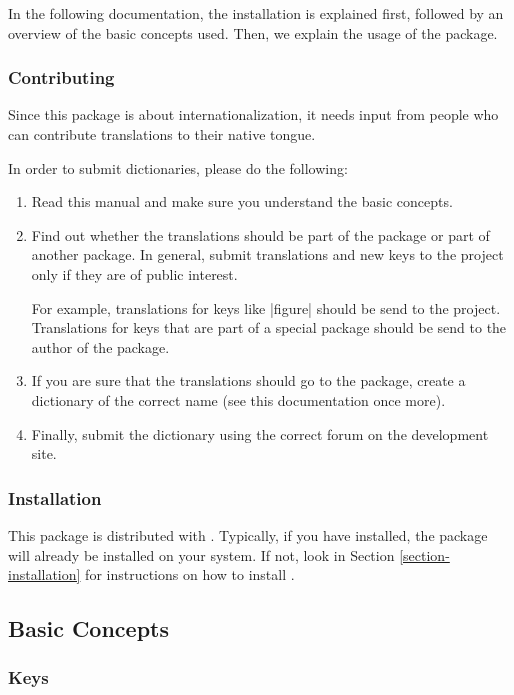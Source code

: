 \documentclass{ltxdoc}
\begin{document}
In the following documentation, the installation is explained first, followed
by an overview of the basic concepts used. Then, we explain the usage of the
package.

\subsubsection{Contributing}

Since this package is about internationalization, it needs input from people
who can contribute translations to their native tongue.

In order to submit dictionaries, please do the following: \begin{enumerate}
\item Read this manual and make sure you understand the basic concepts. \item
Find out whether the translations should be part of the 
package or part of another package. In general, submit translations and new
keys to the  project only if they are of public interest.

For example, translations for keys like |figure| should be send to the
 project. Translations for keys that are part of a special
package should be send to the author of the package. \item If you are sure that
the translations should go to the  package, create a dictionary
of the correct name (see this documentation once more). \item Finally, submit
the dictionary using the correct forum on the development site. \end{enumerate}

\subsubsection{Installation}

This package is distributed with . Typically, if you have
 installed, the package will already be installed on your system.
If not, look in Section \ref{section-installation} for instructions on how to
install .


\subsection{Basic Concepts}

\subsubsection{Keys}
\end{document}
